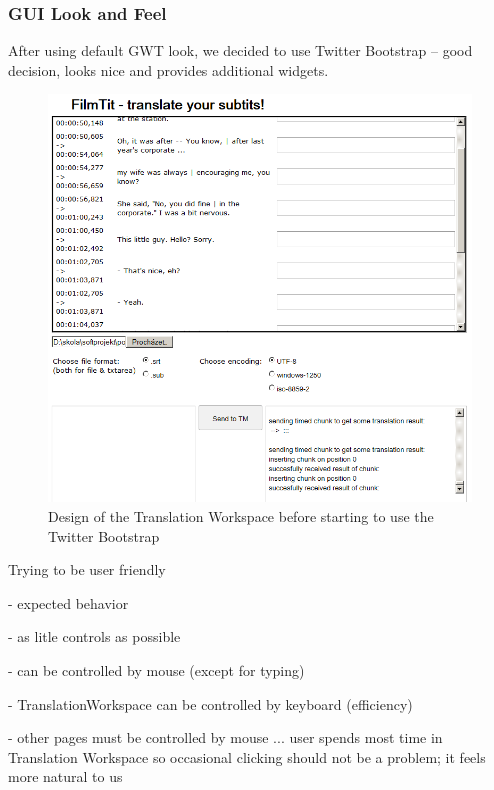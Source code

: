 \subsubsection{GUI Look and Feel}

After using default GWT look, we decided to use Twitter Bootstrap -- good decision, looks nice and provides additional widgets.

\begin{figure}
\begin{center}
\includegraphics[scale=0.5]{figures/old_screenshot.png}
\end{center}
\caption{Design of the Translation Workspace before starting to use the Twitter Bootstrap}
\label{fig:before_bootstrap}
\end{figure}

Trying to be user friendly

- expected behavior

- as litle controls as possible

- can be controlled by mouse (except for typing)

- TranslationWorkspace can be controlled by keyboard (efficiency)

- other pages must be controlled by mouse ... user spends most time in Translation Workspace so occasional clicking should not be a problem; it feels more natural to us

